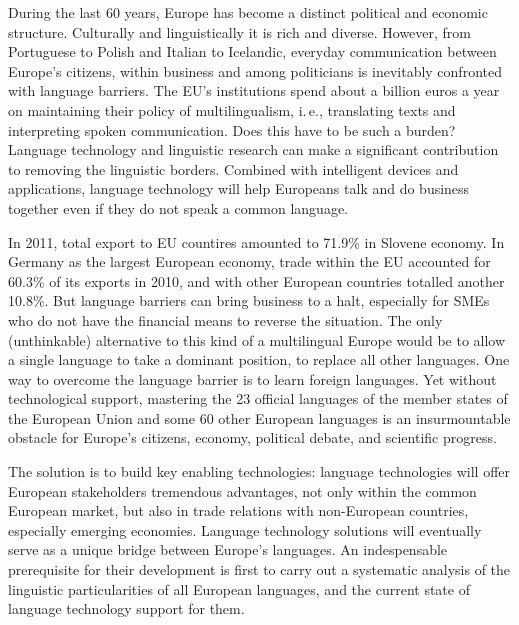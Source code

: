 \begin{multicols}{2}

During the last 60 years, Europe has become a distinct political and economic structure. Culturally and linguistically it is rich and diverse. However, from Portuguese to Polish and Italian to Icelandic, everyday communication between Europe’s citizens, within business and among politicians is inevitably confronted with language barriers. The EU's institutions spend about a billion euros a year on maintaining their policy of multilingualism, i.\,e., translating texts and interpreting spoken communication. Does this have to be such a burden? Language technology and linguistic research can make a significant contribution to removing the linguistic borders. Combined with intelligent devices and applications, language technology will help Europeans talk and do business together even if they do not speak a common language. 


In 2011, total export to EU countires amounted to 71.9\%  in Slovene economy. In Germany as the largest European economy, trade within the EU accounted for 60.3\% of its exports in 2010, and with other European countries totalled another 10.8\%. But language barriers can bring business to a halt, especially for SMEs who do not have the financial means to reverse the situation. The only (unthinkable) alternative to this kind of a multilingual Europe would be to allow a single language to take a dominant position, to replace all other languages. 
One way to overcome the language barrier is to learn foreign languages. Yet without technological support, mastering the 23 official languages of the member states of the European Union and some 60 other European languages is an insurmountable obstacle for Europe’s citizens, economy, political debate, and scientific progress. 

The solution is to build key enabling technologies: language technologies will offer European stakeholders tremendous advantages, not only within the common European market, but also in trade relations with non-European countries, especially emerging economies. Language technology solutions will eventually serve as a unique bridge between Europe's languages. An indespensable prerequisite for their development is first to carry out a systematic analysis of the linguistic particularities of all European languages, and the current state of language technology support for them.  
    

\end{multicols}
